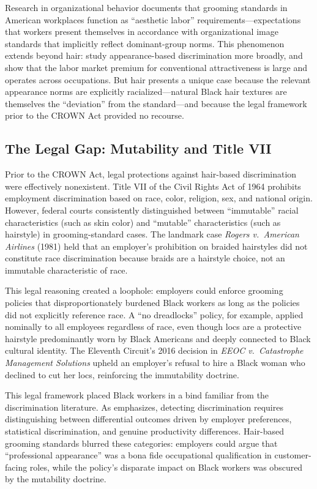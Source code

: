 \documentclass[12pt]{article}
\begin{document}
Research in organizational behavior documents that grooming standards in American workplaces function as ``aesthetic labor'' requirements---expectations that workers present themselves in accordance with organizational image standards that implicitly reflect dominant-group norms. This phenomenon extends beyond hair: \citet{barron2022} study appearance-based discrimination more broadly, and \citet{hamermesh1994} show that the labor market premium for conventional attractiveness is large and operates across occupations. But hair presents a unique case because the relevant appearance norms are explicitly racialized---natural Black hair textures are themselves the ``deviation'' from the standard---and because the legal framework prior to the CROWN Act provided no recourse.

\subsection{The Legal Gap: Mutability and Title VII}

Prior to the CROWN Act, legal protections against hair-based discrimination were effectively nonexistent. Title VII of the Civil Rights Act of 1964 prohibits employment discrimination based on race, color, religion, sex, and national origin. However, federal courts consistently distinguished between ``immutable'' racial characteristics (such as skin color) and ``mutable'' characteristics (such as hairstyle) in grooming-standard cases. The landmark case \textit{Rogers v.\ American Airlines} (1981) held that an employer's prohibition on braided hairstyles did not constitute race discrimination because braids are a hairstyle choice, not an immutable characteristic of race.

This legal reasoning created a loophole: employers could enforce grooming policies that disproportionately burdened Black workers as long as the policies did not explicitly reference race. A ``no dreadlocks'' policy, for example, applied nominally to all employees regardless of race, even though locs are a protective hairstyle predominantly worn by Black Americans and deeply connected to Black cultural identity. The Eleventh Circuit's 2016 decision in \textit{EEOC v.\ Catastrophe Management Solutions} upheld an employer's refusal to hire a Black woman who declined to cut her locs, reinforcing the immutability doctrine.

This legal framework placed Black workers in a bind familiar from the discrimination literature. As \citet{heckman1998} emphasizes, detecting discrimination requires distinguishing between differential outcomes driven by employer preferences, statistical discrimination, and genuine productivity differences. Hair-based grooming standards blurred these categories: employers could argue that ``professional appearance'' was a bona fide occupational qualification in customer-facing roles, while the policy's disparate impact on Black workers was obscured by the mutability doctrine.
\end{document}
